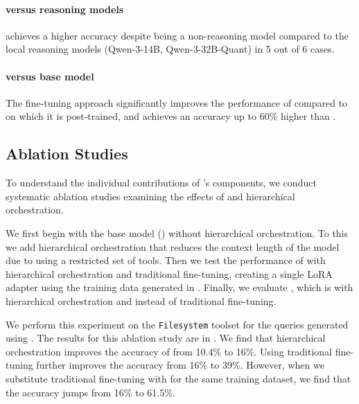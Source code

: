 \paragraph{\sysmodel{} versus reasoning models}
\sysmodel{} achieves a higher accuracy despite being a non-reasoning model compared to the local reasoning models (Qwen-3-14B, Qwen-3-32B-Quant) in 5 out of 6 cases.  

\paragraph{\sysmodel{} versus base model}
The \sys{} fine-tuning approach significantly improves the performance of \sysmodel{} compared to \baselinemodel{} on which it is post-trained, and achieves an accuracy up to 60\% higher than \basemodel{}. 

\subsection{Ablation Studies}
\label{sec:eval:ablation}

To understand the individual contributions of \sys{}'s components, we conduct systematic ablation studies examining the effects of \decoupled{} and hierarchical orchestration.

We first begin with the base model (\baselinemodel{}) without hierarchical orchestration. To this we add hierarchical orchestration that reduces the context length of the model due to using a restricted set of tools. Then we test the performance of \baselinemodel{} with hierarchical orchestration and traditional fine-tuning, creating a single LoRA adapter using the training data generated in \sys{}. Finally, we evaluate \sysmodel{}, which is \baselinemodel{} with hierarchical orchestration and \decoupled{} instead of traditional fine-tuning. 

We perform this experiment on the \texttt{Filesystem} toolset for the queries generated using \mcpbench. The results for this ablation study are in . We find that hierarchical orchestration improves the accuracy of \basemodel{} from 10.4\% to 16\%. Using traditional fine-tuning further improves the accuracy from 16\% to 39\%. However, when we substitute traditional fine-tuning with \decoupled{} for the same training dataset, we find that the accuracy jumps from 16\% to 61.5\%. 

